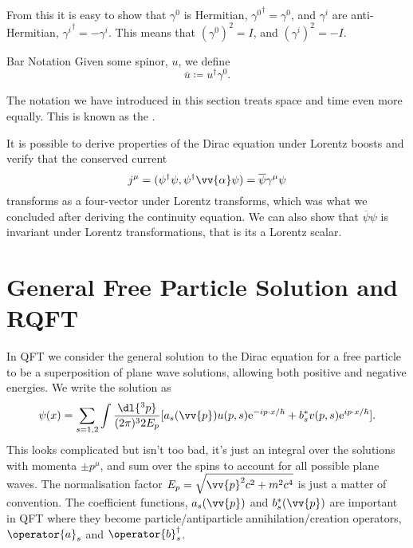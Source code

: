 \documentclass[fleqn]{NotesClass}
\newcommand*{\e}{\mathrm{e}}
\newcommand*{\hermit}{\dagger}
\newcommand{\ident}{I}
\begin{document}
    From this it is easy to show that \(\gamma^0\) is Hermitian, \({\gamma^0}^\hermit = \gamma^0\), and \(\gamma^i\) are anti-Hermitian, \({\gamma^i}^\hermit = -\gamma^i\).
    This means that \((\gamma^0)^2 = \ident\), and \((\gamma^i)^2 = -\ident\).
    
    \begin{ntn}{Bar Notation}{}
        Given some spinor, \(u\), we define
        \begin{equation}
            \overline{u} \coloneqq u^\hermit \gamma^0.
        \end{equation}
    \end{ntn}
    
    The notation we have introduced in this section treats space and time even more equally.
    This is known as the .
    
    It is possible to derive properties of the Dirac equation under Lorentz boosts and verify that the conserved current
    \begin{equation}
        j^\mu = (\psi^\hermit \psi, \psi^\hermit \vv{\alpha} \psi) = \overline{\psi} \gamma^\mu \psi
    \end{equation}
    transforms as a four-vector under Lorentz transforms, which was what we concluded after deriving the continuity equation.
    We can also show that \(\overline{\psi}\psi\) is invariant under Lorentz transformations, that is its a Lorentz scalar.
    
    \section{General Free Particle Solution and RQFT}
    In QFT we consider the general solution to the Dirac equation for a free particle to be a superposition of plane wave solutions, allowing both positive and negative energies.
    We write the solution as
    \begin{equation}
        \psi(x) = \sum_{s = 1, 2} \int \frac{\dl{^3p}}{(2\pi)^32E_p} [a_s(\vv{p})u(p, s)\e^{-ip\cdot x/\hbar} + b_s^*v(p, s)\e^{ip\cdot x/\hbar}].
    \end{equation}
    This looks complicated but isn't too bad, it's just an integral over the solutions with momenta \(\pm p^\mu\), and sum over the spins to account for all possible plane waves.
    The normalisation factor \(E_p = \sqrt{\vv{p}^2c^2 + m^2c^4}\) is just a matter of convention.
    The coefficient functions, \(a_s(\vv{p})\) and \(b_s^*(\vv{p})\) are important in QFT where they become particle/antiparticle annihilation/creation operators, \(\operator{a}_s\) and \(\operator{b}_s^\hermit\).
    
\end{document}
